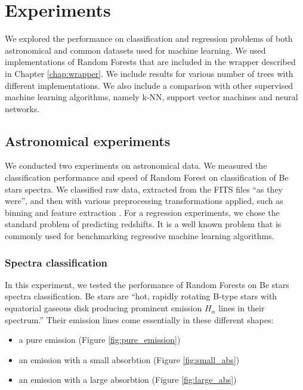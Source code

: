 \documentclass[thesis=B,english]{FITthesis}[2012/10/20]
\begin{document}
\chapter{Experiments}
\label{chap:Experiments}
We explored the performance on classification and regression problems of both astronomical and common datasets used for machine learning. We used implementations of Random Forests that are included in the wrapper described in Chapter \ref{chap:wrapper}. We include results for various number of trees with different implementations. We also include a comparison with other supervised machine learning algorithms, namely k-NN, support vector machines and neural networks.
\section{Astronomical experiments}
We conducted two experiments on astronomical data. We measured the classification performance and speed of Random Forest on classification of Be stars spectra. We classified raw data, extracted from the FITS files  ``as they were'', and then with various preprocessing transformations applied, such as binning and feature extraction \cite{bromovabeclass}. For a regression experiments, we chose the standard problem of predicting redshifts. It is a well known problem \cite{RED13,RED10,RED07} that is commonly used for benchmarking regressive machine learning algorithms.

\subsection{Spectra classification}
In this experiment, we tested the performance of Random Forests on Be stars spectra classification. Be stars are ``hot, rapidly rotating B-type stars with equatorial gaseous disk producing prominent emission $H_\alpha$ lines in their spectrum.''\cite{bromovabeclass} Their emission lines come essentially in these different shapes:
\begin{itemize}
\item a pure emission (Figure \ref{fig:pure_emission})
\item an emission with a small absorbtion (Figure \ref{fig:small_abs})
\item an emission with a large absorbtion (Figure \ref{fig:large_abs})
\end{itemize}
\end{document}
